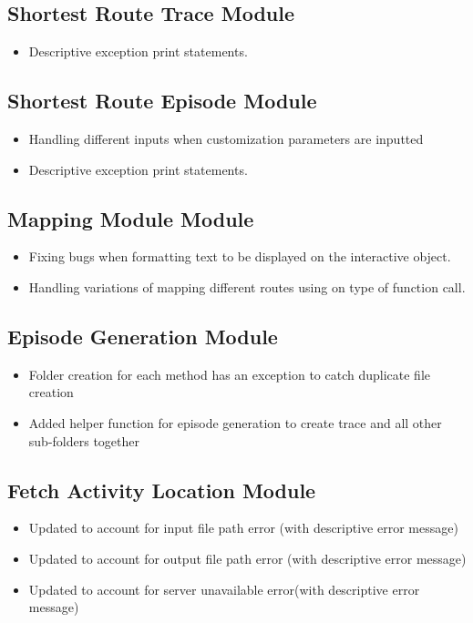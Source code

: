 \documentclass[12pt, titlepage]{article}
\begin{document}
\subsection{Shortest Route Trace Module}
\begin{itemize}
    \item Descriptive exception print statements. 
\end{itemize}
\subsection{Shortest Route Episode Module}
\begin{itemize}
    \item Handling different inputs when customization parameters are inputted
    \item Descriptive exception print statements.
\end{itemize}
\subsection{Mapping Module Module}
\begin{itemize}
    \item Fixing bugs when formatting text to be displayed on the interactive object.
    \item Handling variations of mapping different routes using on type of function call.
\end{itemize}
\subsection{Episode Generation Module}
\begin{itemize}
    \item Folder creation for each method has an exception to catch duplicate file creation\
    \item Added helper function for episode generation to create trace and all other sub-folders together
\end{itemize}
\subsection{Fetch Activity Location Module}
\begin{itemize}
    \item Updated to account for input file path error (with descriptive error message)
    \item Updated to account for output file path error (with descriptive error message)
    \item Updated to account for server unavailable error(with descriptive error message)
\end{itemize}
\end{document}
